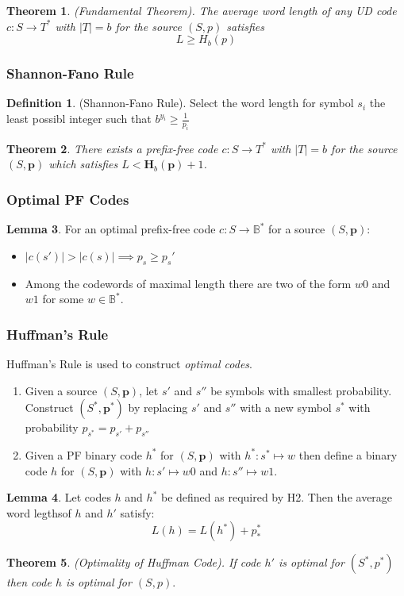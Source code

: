 \documentclass[a4paper]{article}
\newtheorem{theorem}{Theorem}
\theoremstyle{definition} \newtheorem*{definition}{Definition}
\newtheorem{lemma}[theorem]{Lemma}
\newcommand{\pr}{\bm{p}}
\newcommand{\B}{\mathbb{B}}
\begin{document}
\begin{theorem}
  (Fundamental Theorem). The average word length of any UD code 
  $c : S \rightarrow T^*$ with $|T|=b$ for the source $(S,p)$ satisfies
  \[
    \boxed{L \geq H_b(p)}
  \]
  \label{thm:fundamental}
\end{theorem}

\subsubsection*{Shannon-Fano Rule}
\begin{definition}
  (Shannon-Fano Rule). Select the word length for symbol $s_i$ the least
  possibl integer such that $b^{y_i}\geq \frac{1}{p_i}$
\end{definition}

\begin{theorem}
  There exists a prefix-free code $c:S \rightarrow T^*$ with $|T|=b$ for the
  source $(S,\bm{p})$ which satisfies $L < \bm{H}_b(\bm{p})+1$.
  \label{SF}
\end{theorem}

\subsubsection*{Optimal PF Codes}
\begin{lemma}
  For an optimal prefix-free code $c:S \rightarrow \B^*$ for a source
  $(S,\pr)$:
  \begin{itemize}
    \item $|c(s')| > |c(s)| \implies p_s \geq p_s'$
    \item Among the codewords of maximal length there are two of the form
      $w0$ and $w1$ for some $w \in \B^{*}$.
  \end{itemize}
  \label{optpf}
\end{lemma}

\subsubsection*{Huffman's Rule}
Huffman's Rule is used to construct \emph{optimal codes}.
\begin{enumerate}
  \item Given a source $(S,\pr)$, let $s'$ and $s''$ be symbols with 
    smallest probability. Construct $(S^*,\pr^*)$ by replacing $s'$ and
    $s''$ with a new symbol $s^*$ with probability 
    $p_{s^*}=p_{s'}+p_{s''}$
  \item Given a PF binary code $h^*$ for $(S,\pr)$ with 
    $h^*:s^*\mapsto w$ then define a binary code $h$ for $(S,\pr)$ with
    $h:s' \mapsto w0$ and $h : s'' \mapsto w1$.
\end{enumerate}

\begin{lemma}
  Let codes $h$ and $h^*$ be defined as required by H2. Then the average
  word legthsof $h$ and $h'$ satisfy:
  \[
    L(h)=L(h^*)+p_*^*
  \]
  \label{avgwordlength}
\end{lemma}

\begin{theorem}
  (Optimality of Huffman Code). 
  If code $h'$ is optimal for $(S^*,p^*)$ then code $h$ is optimal for
  $(S,p).$
  \label{optimalhuff}
\end{theorem}
\end{document}
